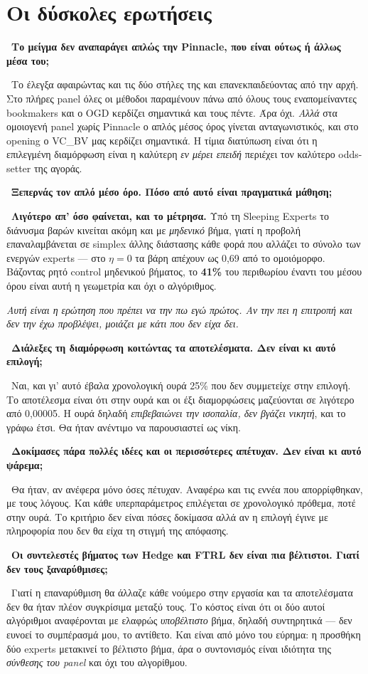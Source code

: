 \documentclass[11pt,a4paper]{article}
\newcommand{\qa}[2]{%
  \par\medskip\noindent{\color{qcol}\textbf{Ε.}}\ \textbf{#1}\par
  \noindent{\color{qcol}\textbf{Α.}}\ #2\par}
\newcommand{\trap}[1]{\par\smallskip\noindent{\color{warn}\textbf{Προσοχή:}} \emph{#1}\par}
\begin{document}
\section{Οι δύσκολες ερωτήσεις}

\qa{Το μείγμα δεν αναπαράγει απλώς την Pinnacle, που είναι ούτως ή άλλως μέσα του;}
{Το έλεγξα αφαιρώντας και τις δύο στήλες της και επανεκπαιδεύοντας από την αρχή. Στο πλήρες
panel όλες οι μέθοδοι παραμένουν πάνω από όλους τους εναπομείναντες bookmakers και ο OGD
κερδίζει σημαντικά και τους πέντε. Άρα όχι. \emph{Αλλά} στα ομοιογενή panel χωρίς Pinnacle ο
απλός μέσος όρος γίνεται ανταγωνιστικός, και στο opening ο VC\_BV μας κερδίζει σημαντικά. Η
τίμια διατύπωση είναι ότι η επιλεγμένη διαμόρφωση είναι η καλύτερη \emph{εν μέρει επειδή}
περιέχει τον καλύτερο odds-setter της αγοράς.}

\qa{Ξεπερνάς τον απλό μέσο όρο. Πόσο από αυτό είναι πραγματικά μάθηση;}
{\textbf{Λιγότερο απ' όσο φαίνεται, και το μέτρησα.} Υπό τη Sleeping Experts το διάνυσμα
βαρών κινείται ακόμη και με \emph{μηδενικό} βήμα, γιατί η προβολή επαναλαμβάνεται σε simplex
άλλης διάστασης κάθε φορά που αλλάζει το σύνολο των ενεργών experts --- στο $\eta=0$ τα βάρη
απέχουν ως 0,69 από το ομοιόμορφο. Βάζοντας ρητό control μηδενικού βήματος, το \textbf{41\%}
του περιθωρίου έναντι του μέσου όρου είναι αυτή η γεωμετρία και όχι ο αλγόριθμος.}
\trap{Αυτή είναι η ερώτηση που πρέπει να την πω εγώ πρώτος. Αν την πει η επιτροπή και δεν
την έχω προβλέψει, μοιάζει με κάτι που δεν είχα δει.}

\qa{Διάλεξες τη διαμόρφωση κοιτώντας τα αποτελέσματα. Δεν είναι κι αυτό επιλογή;}
{Ναι, και γι' αυτό έβαλα χρονολογική ουρά 25\% που δεν συμμετείχε στην επιλογή. Το
αποτέλεσμα είναι ότι στην ουρά και οι έξι διαμορφώσεις μαζεύονται σε λιγότερο από 0,00005. Η
ουρά δηλαδή \emph{επιβεβαιώνει την ισοπαλία, δεν βγάζει νικητή}, και το γράφω έτσι. Θα ήταν
ανέντιμο να παρουσιαστεί ως νίκη.}

\qa{Δοκίμασες πάρα πολλές ιδέες και οι περισσότερες απέτυχαν. Δεν είναι κι αυτό ψάρεμα;}
{Θα ήταν, αν ανέφερα μόνο όσες πέτυχαν. Αναφέρω και τις εννέα που απορρίφθηκαν, με τους
λόγους. Και κάθε υπερπαράμετρος επιλέγεται σε χρονολογικό πρόθεμα, ποτέ στην ουρά. Το
κριτήριο δεν είναι πόσες δοκίμασα αλλά αν η επιλογή έγινε με πληροφορία που δεν θα είχα τη
στιγμή της απόφασης.}

\qa{Οι συντελεστές βήματος των Hedge και FTRL δεν είναι πια βέλτιστοι. Γιατί δεν τους
ξαναρύθμισες;}
{Γιατί η επαναρύθμιση θα άλλαζε κάθε νούμερο στην εργασία και τα αποτελέσματα δεν θα ήταν
πλέον συγκρίσιμα μεταξύ τους. Το κόστος είναι ότι οι δύο αυτοί αλγόριθμοι αναφέρονται με
ελαφρώς \emph{υποβέλτιστο} βήμα, δηλαδή συντηρητικά --- δεν ευνοεί το συμπέρασμά μου, το
αντίθετο. Και είναι από μόνο του εύρημα: η προσθήκη δύο experts μετακινεί το βέλτιστο βήμα,
άρα ο συντονισμός είναι ιδιότητα της \emph{σύνθεσης του panel} και όχι του αλγορίθμου.}
\end{document}
